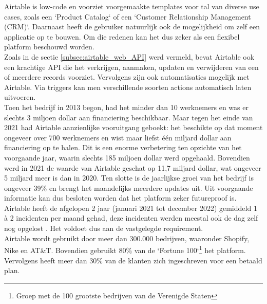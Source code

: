 Airtable is low-code en voorziet voorgemaakte templates voor tal van diverse use cases, zoals een `Product Catalog` of een `Customer Relationship Management (CRM)`. Daarnaast heeft de gebruiker natuurlijk ook de mogelijkheid om zelf een applicatie op te bouwen. Om die redenen kan het dus zeker als een flexibel platform beschouwd worden. \\

Zoals in de sectie \ref{subsec:airtable_web_API} werd vermeld, bevat Airtable ook een krachtige API die het verkrijgen, aanmaken, updaten en verwijderen van een of meerdere records voorziet. Vervolgens zijn ook automatisaties mogelijk met Airtable. Via triggers kan men verschillende soorten actions automatisch laten uitvoeren. \\

Toen het bedrijf in 2013 begon, had het minder dan 10 werknemers en was er slechts 3 miljoen dollar aan financiering beschikbaar. Maar tegen het einde van 2021 had Airtable aanzienlijke vooruitgang geboekt: het beschikte op dat moment ongeveer over 700 werknemers en wist maar liefst één miljard dollar aan financiering op te halen. Dit is een enorme verbetering ten opzichte van het voorgaande jaar, waarin slechts 185 miljoen dollar werd opgehaald. Bovendien werd in 2021 de waarde van Airtable geschat op 11,7 miljard dollar, wat ongeveer 5 miljard meer is dan in 2020. Ten slotte is de jaarlijkse groei van het bedrijf is ongeveer 39\% en brengt het maandelijks meerdere updates uit. Uit voorgaande informatie kan dus besloten worden dat het platform zeker futureproof is. \\

Airtable heeft de afgelopen 2 jaar (januari 2021 tot december 2022) gemiddeld 1 à 2 incidenten per maand gehad, deze incidenten werden meestal ook de dag zelf nog opgelost . Het voldoet dus aan de vastgelegde requirement. \\

Airtable wordt gebruikt door meer dan 300.000 bedrijven, waaronder Shopify, Nike en AT\&T. Bovendien gebruikt 80\% van de `Fortune 100`\footnote{Groep met de 100 grootste bedrijven van de Verenigde Staten} het platform. Vervolgens heeft meer dan 30\% van de klanten zich ingeschreven voor een betaald plan. \\


